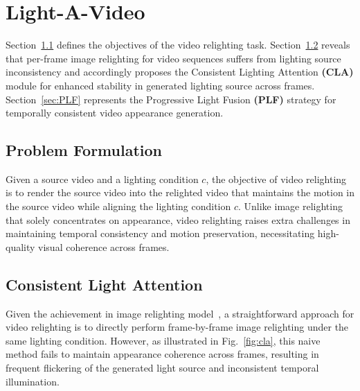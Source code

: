 \section{Light-A-Video}
\label{sec:method}



Section~\ref{sec:PF} defines the objectives of the video relighting task. Section~\ref{sec:CLA} reveals that per-frame image relighting for video sequences suffers from lighting source inconsistency
and accordingly proposes the Consistent Lighting Attention \textbf{(CLA)} module for enhanced stability in generated lighting source across frames. Section~\ref{sec:PLF} represents the Progressive Light Fusion \textbf{(PLF)} strategy for temporally consistent video
appearance generation.
\subsection{Problem Formulation}
\label{sec:PF}
Given a source video and a lighting condition $c$, 
the objective of video relighting is to
render the source video into the relighted video that maintains the motion in the source video while aligning the lighting condition $c$.
Unlike image relighting that solely concentrates on appearance, video relighting raises extra challenges in
maintaining temporal consistency and motion preservation, necessitating high-quality visual coherence across frames.
\subsection{Consistent Light Attention}
\label{sec:CLA}
Given the achievement in image relighting model~\cite{zhang2025scaling}, a straightforward approach for video relighting is to
directly perform frame-by-frame image relighting under the same lighting condition. 
However, as illustrated in Fig.~\ref{fig:cla}, this naive method fails to maintain appearance coherence across frames,
resulting in frequent flickering of the generated light source
and inconsistent temporal illumination.

